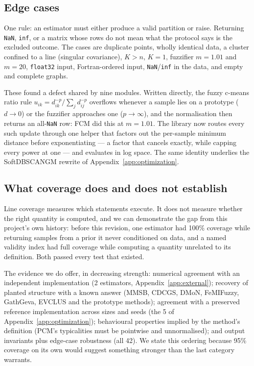 \documentclass[twoside,11pt]{article}
\begin{document}
\subsection{Edge cases}

One rule: an estimator must either produce a valid partition or raise.
Returning \texttt{NaN}, \texttt{inf}, or a matrix whose rows do not mean what
the protocol says is the excluded outcome. The cases are duplicate points,
wholly identical data, a cluster confined to a line (singular covariance),
$K > n$, $K = 1$, fuzzifier $m = 1.01$ and $m = 20$, \texttt{float32} input,
Fortran-ordered input, \texttt{NaN}/\texttt{inf} in the data, and empty and
complete graphs.

These found a defect shared by nine modules. Written directly, the fuzzy
c-means ratio rule
$u_{ik} = d_{ik}^{-p} / \sum_j d_{ij}^{-p}$ overflows whenever a sample lies
on a prototype ($d \to 0$) or the fuzzifier approaches one ($p \to \infty$),
and the normalisation then returns an all-\texttt{NaN} row: FCM did this at
$m = 1.01$. The library now routes every such update through one helper that
factors out the per-sample minimum distance before exponentiating --- a
factor that cancels exactly, while capping every power at one --- and
evaluates in log space. The same identity underlies the SoftDBSCANGM rewrite
of Appendix~\ref{app:optimization}.

\subsection{What coverage does and does not establish}

Line coverage measures which statements execute. It does not measure whether
the right quantity is computed, and we can demonstrate the gap from this
project's own history: before this revision, one estimator had 100\% coverage
while returning samples from a prior it never conditioned on data, and a
named validity index had full coverage while computing a quantity unrelated
to its definition. Both passed every test that existed.

The evidence we do offer, in decreasing strength: numerical agreement with an
independent implementation (2 estimators, Appendix~\ref{app:external});
recovery of planted structure with a known answer (MMSB, CDCGS, DMoN,
FeMIFuzzy, GathGeva, EVCLUS and the prototype methods); agreement with a
preserved reference implementation across sizes and seeds (the 5 of
Appendix~\ref{app:optimization}); behavioural properties implied by the
method's definition (PCM's typicalities must be pointwise and unnormalised);
and output invariants plus edge-case robustness (all 42). We state this
ordering because 95\% coverage on its own would suggest something stronger
than the last category warrants.
\end{document}
